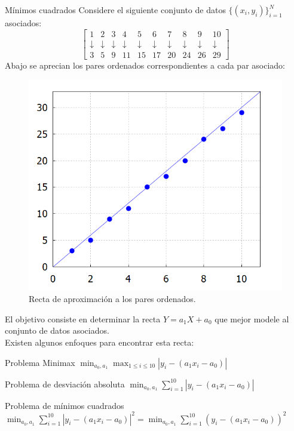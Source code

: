\begin{frame}[allowframebreaks]{Mínimos cuadrados}
Considere el siguiente conjunto de datos $\{(x_i,y_i)\}_{i=1}^{N}$ asociados:
\begin{displaymath}
\begin{bmatrix}
1&2&3&4&5&6&7&8&9&10\\
\downarrow &\downarrow &\downarrow &\downarrow &\downarrow &\downarrow &\downarrow &\downarrow &\downarrow &\downarrow\\
3&5&9&11&15&17&20&24&26&29
\end{bmatrix}
\end{displaymath}
Abajo se aprecian los pares ordenados correspondientes a cada par asociado:
\begin{figure}[H]
\includegraphics[scale=0.55]{Imagen2}
\caption{Recta de aproximación a los pares ordenados.}
\end{figure}
\indent El objetivo consiste en determinar la recta $Y=a_1X+a_0$ que mejor modele al conjunto de datos asociados.\\
\indent Existen algunos enfoques para encontrar esta recta:
\begin{block}{Problema Minimax}
\centering $\displaystyle \min_{a_0,a_1}\max_{1\leq i\leq 10}|y_i-(a_1x_i-a_0)|$
\end{block}
\begin{block}{Problema de desviación absoluta}
\centering $\displaystyle \min_{a_0,a_1}\sum_{i=1}^{10}|y_i-(a_1x_i-a_0)|$
\end{block}
\begin{block}{Problema de mínimos cuadrados}
\centering $\displaystyle \min_{a_0,a_1}\sum_{i=1}^{10}|y_i-(a_1x_i-a_0)|^2=\displaystyle \min_{a_0,a_1}\sum_{i=1}^{10}(y_i-(a_1x_i-a_0))^2$
\end{block}
\end{frame}
